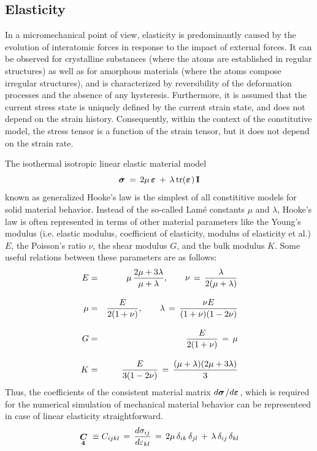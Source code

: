 \subsection{Elasticity}
\label{sec:elasticity}

In a micromechanical point of view, elasticity is predominantly caused by the evolution of interatomic forces in response to the impact of
external forces. It can be observed for crystalline substances (where the atoms are established in regular structures) as well as for
amorphous materials (where the atoms compose irregular structures), and is characterized by reversibility of the deformation processes and
the absence of any hysteresis. Furthermore, it is assumed that the current stress state is uniquely defined by the current strain state,
and does not depend on the strain history. Consequently, within the context of the constitutive model, the stress tensor is a function of
the strain tensor, but it does not depend on the strain rate. 

The isothermal isotropic linear elastic material model 
\begin{equation}
\miu{\sigma}{}{}\,=\,2\mu\,\miu{\varepsilon}{}{}\,+\,\lambda\,\mathrm{tr}(\miu{\varepsilon}{}{})\,\mathbf{I}
\label{eq:hooke_isotherm}
\end{equation}
known as generalized Hooke's law is the simplest of all constititive models for solid material behavior. Instead of the so-called
Lam{\'{e}} constants $\mu$ and $\lambda$, Hooke's law is often represented in terms of other material parameters like the Young's modulus
(i.e. elastic modulus, coefficient of elasticity, modulus of elasticity et al.) $E$, the Poisson's ratio $\nu$, the shear modulus $G$, and
the bulk modulus $K$. Some useful relations between these parameters are as follows:
\begin{eqnarray*}
E & = & \mu\,\frac{\textstyle{\textstyle{2\mu+3\lambda}}}{\textstyle{\textstyle{\mu+\lambda}}},\qquad
\nu\,=\,\frac{\textstyle{\textstyle{\lambda}}}{\textstyle{\textstyle{2(\mu+\lambda)}}} \\[2.0ex]
\mu & = & \frac{\textstyle{\textstyle{E}}}{\textstyle{\textstyle{2(1+\nu)}}},\qquad
\lambda\,=\,\frac{\textstyle{\textstyle{\nu E}}}{\textstyle{\textstyle{(1+\nu)(1-2\nu)}}} \\[2.0ex]
G & = & \frac{\textstyle{\textstyle{E}}}{\textstyle{\textstyle{2(1+\nu)}}}\,=\,\mu \\[2.0ex]
K & = & \frac{\textstyle{\textstyle{E}}}{\textstyle{\textstyle{3(1-2\nu)}}}\,=\,\frac{\textstyle{\textstyle{(\mu+\lambda)(2\mu+3\lambda)}}}{\textstyle{\textstyle{3}}}
\end{eqnarray*}
Thus, the coefficients of the consistent material matrix $d\mbox{${\mbox{\boldmath${\sigma}$\unboldmath}}_{\:\!}$}/d\mbox{${\mbox{\boldmath${\varepsilon}$\unboldmath}}_{\:\!}$}$, which is required for the numerical
simulation of mechanical material behavior can be representeed in case of linear elasticity straightforward.
\begin{equation}
\mbox{${\mbox{\boldmath$\textstyle{\mathop{C}\limits_{\bf 4}}$ \unboldmath}}$}
\equiv
{C}_{ijkl}\,=\,\frac{d\sigma_{ij}}{d\varepsilon_{kl}}\,=\,2\mu\,\delta_{ik}\,\delta_{jl}\,+\,\lambda\,\delta_{ij}\,\delta_{kl}
\end{equation}

